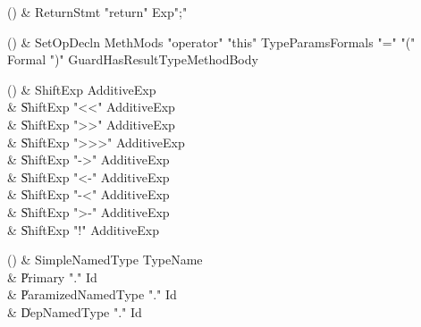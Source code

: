 \begin{bbgrammarappendix}{4.0in}

() & ReturnStmt \label{prod:ReturnStmt}  \: \xcd"return" Exp\opt \xcd";"  \\


\end{bbgrammarappendix}

\begin{bbgrammarappendix}{4.0in}

() & SetOpDecln \label{prod:SetOpDecln}  \: MethMods \xcd"operator" \xcd"this" TypeParams\opt Formals \xcd"=" \xcd"(" Formal  \xcd")" Guard\opt HasResultType\opt MethodBody  \\


\end{bbgrammarappendix}

\begin{bbgrammarappendix}{4.2in}

() & ShiftExp \label{prod:ShiftExp}  \: AdditiveExp  \\

 &    \| ShiftExp \xcd"<<" AdditiveExp \\
 &    \| ShiftExp \xcd">>" AdditiveExp \\
 &    \| ShiftExp \xcd">>>" AdditiveExp \\
 &    \| ShiftExp  \xcd"->" AdditiveExp  \\
 &    \| ShiftExp  \xcd"<-" AdditiveExp  \\
 &    \| ShiftExp  \xcd"-<" AdditiveExp  \\
 &    \| ShiftExp  \xcd">-" AdditiveExp  \\
 &    \| ShiftExp  \xcd"!" AdditiveExp  \\

\end{bbgrammarappendix}

\begin{bbgrammarappendix}{3.5in}

() & SimpleNamedType \label{prod:SimpleNamedType}  \: TypeName  \\

 &    \| Primary \xcd"." Id \\
 &    \| ParamizedNamedType \xcd"." Id \\
 &    \| DepNamedType \xcd"." Id \\

\end{bbgrammarappendix}

